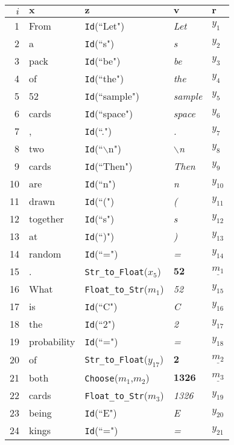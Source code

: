 \begin{table}[t]
\centering
\small
\begin{tabular}{@{}r|l|l|l|l@{}}
\toprule
$i$ & $\boldsymbol{x}$ & $\boldsymbol{z}$ & $\boldsymbol{v}$ & $\boldsymbol{r}$\\
\midrule
1 & From & {\tt Id}(``Let") & \emph{Let} & $y_{1}$ \\
2 & a & {\tt Id}(``s") & \emph{s} & $y_{2}$ \\
3 & pack & {\tt Id}(``be") & \emph{be} & $y_{3}$ \\
4 & of & {\tt Id}(``the") & \emph{the} & $y_{4}$ \\
5 & 52 & {\tt Id}(``sample") & \emph{sample} & $y_{5}$ \\
6 & cards & {\tt Id}(``space") & \emph{space} & $y_{6}$ \\
7 & , & {\tt Id}(``.") & \emph{.} & $y_{7}$ \\
8 & two & {\tt Id}(``$\backslash$n") & \emph{$\backslash$n} & $y_{8}$ \\
9 & cards & {\tt Id}(``Then") & \emph{Then} & $y_{9}$ \\
10 & are & {\tt Id}(``n") & \emph{n} & $y_{10}$ \\
11 & drawn & {\tt Id}(``(") & \emph{(} & $y_{11}$ \\
12 & together & {\tt Id}(``s") & \emph{s} & $y_{12}$ \\
13 & at & {\tt Id}(``)") & \emph{)} & $y_{13}$ \\
14 & random & {\tt Id}(``=") & \emph{=} & $y_{14}$ \\
15 & . & {\tt Str\_to\_Float}($x_5$) & $\boldsymbol{52}$ & $\underline{m_{1}}$ \\
16 & What & {\tt Float\_to\_Str}($m_1$) & \emph{52} & $y_{15}$ \\
17 & is & {\tt Id}(``C") & \emph{C} & $y_{16}$ \\
18 & the & {\tt Id}(``2") & \emph{2} & $y_{17}$ \\
19 & probability & {\tt Id}(``=") & \emph{=} & $y_{18}$ \\
20 & of & {\tt Str\_to\_Float}($y_{17}$) & $\boldsymbol{2}$  & $\underline{m_{2}}$ \\
21 & both & {\tt Choose}($m_1$,$m_2$) & $\boldsymbol{1326}$ & $\underline{m_{3}}$ \\
22 & cards & {\tt Float\_to\_Str}($m_3$) & \emph{1326} & $y_{19}$ \\
23 & being & {\tt Id}(``E") & \emph{E} & $y_{20}$ \\
24 & kings & {\tt Id}(``=") & \emph{=} & $y_{21}$ \\

\end{tabular}
\end{table}
